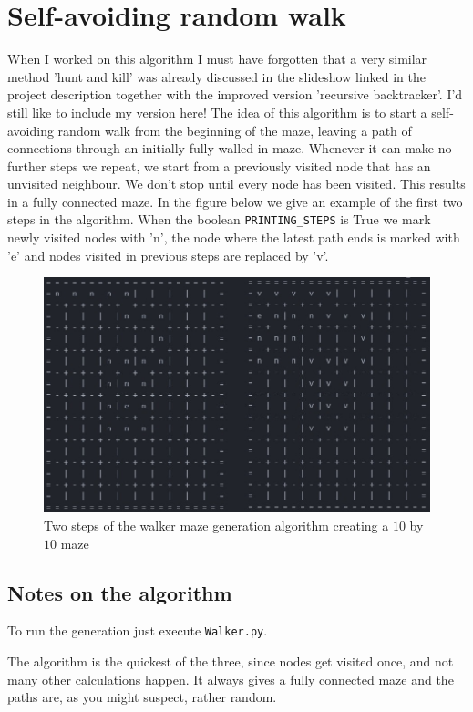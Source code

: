 \documentclass[10pt, a4paper, twoside]{amsart}
\newcommand{\1}{\mathbbm{1}}
\begin{document}
\section{Self-avoiding random walk}
When I worked on this algorithm I must have forgotten that a very similar method 'hunt and kill' was already discussed in the slideshow linked in the project description together with the improved version 'recursive backtracker'. I'd still like to include my version here!
The idea of this algorithm is to start a self-avoiding random walk from the beginning of the maze, leaving a path of connections through an initially fully walled in maze. Whenever it can make no further steps we repeat, we start from a previously visited node that has an unvisited neighbour. We don't stop until  every node has been visited. This results in a fully connected maze. In the figure below we give an example of the first two steps in the algorithm. When the boolean \verb+PRINTING_STEPS+ is True we mark newly visited nodes with 'n', the node where the latest path ends is marked with 'e' and nodes visited in previous steps are replaced by 'v'.

\begin{figure}
\centering
        \includegraphics[totalheight=8cm]{beginwalker}
    \caption{Two steps of the walker maze generation algorithm creating a $10$ by $10$ maze}
\end{figure}


\subsection*{Notes on the algorithm}
To run the generation just execute \verb+Walker.py+.

The algorithm is the quickest of the three, since nodes get visited once, and not many other calculations happen. It always gives a fully connected maze and the paths are, as you might suspect, rather random.
\end{document}
